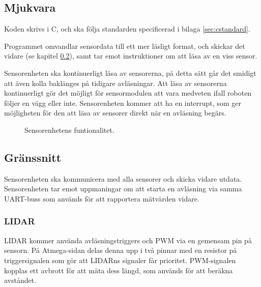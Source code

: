 \documentclass[a4paper,11pt]{article}
\begin{document}
\subsection{Mjukvara}

Koden skrivs i C, och ska följa standarden specificerad i bilaga \ref{sec:cstandard}.

Programmet omvandlar sensordata till ett mer läsligt format, och skickar det vidare (se kapitel \ref{ssec:sensorInterface}), samt tar emot instruktioner om att läsa av en viss sensor. 

Sensorenheten ska kontinuerligt läsa av sensorerna, på detta sätt går det smidigt att även kolla baklänges på tidigare avläsningar. Att läsa av sensorerna kontinuerligt gör det möjligt för sensormodulen att vara medveten ifall roboten följer en vägg eller inte. Sensorenheten kommer att ha en interrupt, som ger möjligheten för den att läsa av sensorer direkt när en avläsning begärs.

\begin{figure}[h!]
	\caption{Sensorenhetens funtionalitet.}
	\label{fig:unitSensorFunktion}
\end{figure}

\subsection{Gränssnitt} \label{ssec:sensorInterface}
Sensorenheten ska kommunicera med alla sensorer och skicka vidare utdata. Sensorenheten tar emot uppmaningar om att starta en avläsning via samma UART-buss som används för att rapportera mätvärden vidare.

\subsubsection{LIDAR}
LIDAR kommer använda avläsningstriggers och PWM via en gemensam pin på sensorn. På Atmega-sidan delas denna upp i två pinnar med en resistor på triggersignalen som gör att LIDARns signaler får prioritet. PWM-signalen kopplas ett avbrott för att mäta dess längd, som används för att beräkna avståndet.
\end{document}
